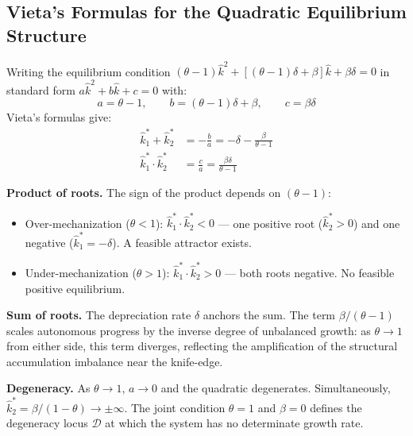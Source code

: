 \documentclass[11pt,a4paper]{article}
\begin{document}

\subsection{Vieta's Formulas for the Quadratic Equilibrium Structure}
\label{app:vieta}

Writing the equilibrium condition $(\theta-1)\hat{k}^2 + [(\theta-1)\delta + \beta]\hat{k} + \beta\delta = 0$ in standard form $a\hat{k}^2 + b\hat{k} + c = 0$ with:
%
\begin{equation}
	a = \theta - 1, \qquad b = (\theta-1)\delta + \beta, \qquad c = \beta\delta
\end{equation}
%
Vieta's formulas give:
%
\begin{align}
	\hat{k}_1^* + \hat{k}_2^* &= -\frac{b}{a} = -\delta - \frac{\beta}{\theta - 1} \label{eq:app_vieta_sum} \\[6pt]
	\hat{k}_1^* \cdot \hat{k}_2^* &= \frac{c}{a} = \frac{\beta\delta}{\theta - 1} \label{eq:app_vieta_product}
\end{align}

\textbf{Product of roots.} The sign of the product depends on $(\theta - 1)$:
\begin{itemize}
	\item Over-mechanization ($\theta < 1$): $\hat{k}_1^* \cdot \hat{k}_2^* < 0$ — one positive root ($\hat{k}_2^* > 0$) and one negative ($\hat{k}_1^* = -\delta$). A feasible attractor exists.
	\item Under-mechanization ($\theta > 1$): $\hat{k}_1^* \cdot \hat{k}_2^* > 0$ — both roots negative. No feasible positive equilibrium.
\end{itemize}

\textbf{Sum of roots.} The depreciation rate $\delta$ anchors the sum. The term $\beta/(\theta-1)$ scales autonomous progress by the inverse degree of unbalanced growth: as $\theta \to 1$ from either side, this term diverges, reflecting the amplification of the structural accumulation imbalance near the knife-edge.

\textbf{Degeneracy.} As $\theta \to 1$, $a \to 0$ and the quadratic degenerates. Simultaneously, $\hat{k}_2^* = \beta/(1-\theta) \to \pm\infty$. The joint condition $\theta = 1$ and $\beta = 0$ defines the degeneracy locus $\mathcal{D}$ at which the system has no determinate growth rate.
\end{document}
